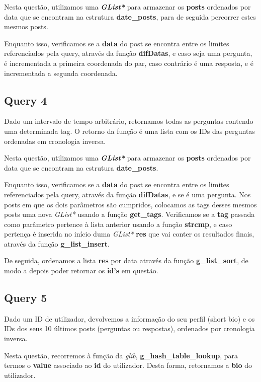 \documentclass[a4paper]{article}
\begin{document}
Nesta questão, utilizamos uma \textit{\textbf{GList*}} para armazenar 
os \textbf{posts} ordenados por data que se encontram na estrutura 
\textbf{date\_posts}, para de seguida percorrer estes mesmos posts.

Enquanto isso, verificamos se a \textbf{data} do post se encontra entre 
os limites referenciados pela query, através da função \textbf{difDatas},
e caso seja uma pergunta, é incrementada a primeira coordenada do par,
caso contrário é uma resposta, e é incrementada a segunda coordenada.

\subsection{Query 4}

Dado um intervalo de tempo arbitrário, retornamos todas as perguntas 
contendo uma determinada tag. O retorno da função é uma lista com os IDs 
das perguntas ordenadas em cronologia inversa.

Nesta questão, utilizamos uma \textit{\textbf{GList*}} para armazenar 
os \textbf{posts} ordenados por data que se encontram na estrutura 
\textbf{date\_posts}.

Enquanto isso, verificamos se a \textbf{data} do post se encontra entre 
os limites referenciados pela query, através da função \textbf{difDatas},
e se é uma pergunta. Nos posts em que os dois parâmetros são cumpridos,
colocamos as tags desses mesmos posts uma nova \textit{GList*}
usando a função \textbf{get\_tags}. Verificamos se a \textbf{tag} passada 
como parâmetro pertence à lista anterior usando a função \textbf{strcmp},
e caso pertença é inserida no início duma \textit{GList*} \textbf{res} 
que vai conter os resultados finais, através da função 
\textbf{g\_list\_insert}.

De seguida, ordenamos a lista \textbf{res} por data através da função
\textbf{g\_list\_sort}, de modo a depois poder retornar os \textbf{id's}
em questão.

\subsection{Query 5}

Dado um ID de utilizador, devolvemos a informação do seu perfil (short 
bio) e os IDs dos seus 10 últimos posts (perguntas ou respostas), 
ordenados por cronologia inversa.

Nesta questão, recorremos à função da \textit{glib}, 
\textbf{g\_hash\_table\_lookup}, para termos o \textbf{value} 
associado ao \textbf{id} do utilizador. Desta forma, retornamos a 
\textbf{bio} do utilizador.
\end{document}
